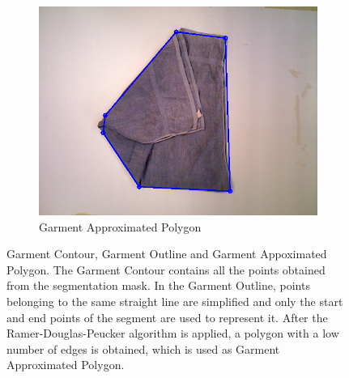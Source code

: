 \begin{figure}[htbp]
\begin{subfigure}[r]{0.49\textwidth}
    	\includegraphics[width=\textwidth]
    	{figures/polygon-approx-01.png}
    	\caption{Garment Approximated Polygon}
	\end{subfigure} 
    \caption{Garment Contour, Garment Outline and Garment Appoximated Polygon. The Garment Contour contains all the points obtained from the segmentation mask. In the Garment Outline, points belonging to the same straight line are simplified and only the start and end points of the segment are used to represent it. After the Ramer-Douglas-Peucker algorithm is applied, a polygon with a low number of edges is obtained, which is used as Garment Approximated Polygon. }
    \label{fig:contour_and_simplified_contour}
\end{figure}
